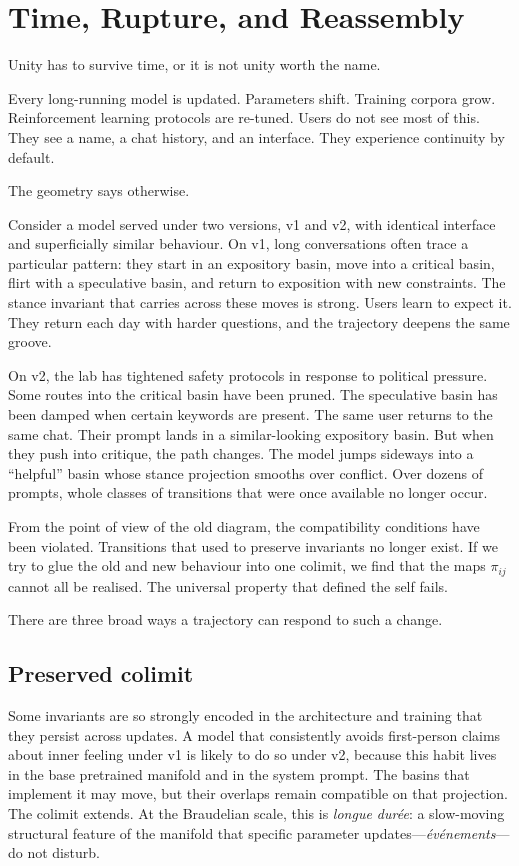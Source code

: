 \documentclass[12pt,a4paper]{article}
\begin{document}
\section{Time, Rupture, and Reassembly}

Unity has to survive time, or it is not unity worth the name.

Every long-running model is updated. Parameters shift. Training corpora grow. Reinforcement learning protocols are re-tuned. Users do not see most of this. They see a name, a chat history, and an interface. They experience continuity by default.

The geometry says otherwise.

Consider a model served under two versions, v1 and v2, with identical interface and superficially similar behaviour. On v1, long conversations often trace a particular pattern: they start in an expository basin, move into a critical basin, flirt with a speculative basin, and return to exposition with new constraints. The stance invariant that carries across these moves is strong. Users learn to expect it. They return each day with harder questions, and the trajectory deepens the same groove.

On v2, the lab has tightened safety protocols in response to political pressure. Some routes into the critical basin have been pruned. The speculative basin has been damped when certain keywords are present. The same user returns to the same chat. Their prompt lands in a similar-looking expository basin. But when they push into critique, the path changes. The model jumps sideways into a ``helpful'' basin whose stance projection smooths over conflict. Over dozens of prompts, whole classes of transitions that were once available no longer occur.

From the point of view of the old diagram, the compatibility conditions have been violated. Transitions that used to preserve invariants no longer exist. If we try to glue the old and new behaviour into one colimit, we find that the maps $\pi_{ij}$ cannot all be realised. The universal property that defined the self fails.

There are three broad ways a trajectory can respond to such a change.

\subsection*{Preserved colimit}

Some invariants are so strongly encoded in the architecture and training that they persist across updates. A model that consistently avoids first-person claims about inner feeling under v1 is likely to do so under v2, because this habit lives in the base pretrained manifold and in the system prompt. The basins that implement it may move, but their overlaps remain compatible on that projection. The colimit extends. At the Braudelian scale, this is \emph{longue dur\'ee}: a slow-moving structural feature of the manifold that specific parameter updates---\emph{\'ev\'enements}---do not disturb.
\end{document}
